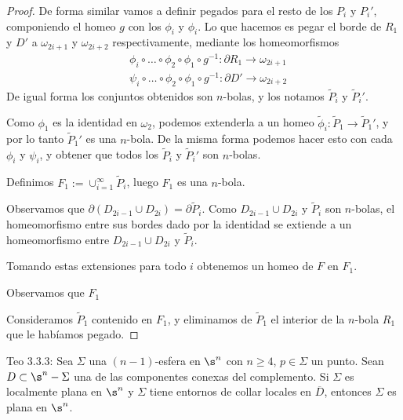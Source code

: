 \begin{proof}
De forma similar vamos a definir pegados para el resto de los $P_i$ y $P_i'$, componiendo el homeo $g$ con los $\phi_i$ y $\phi_i$. Lo que hacemos es pegar el borde de $R_1$ y $D'$ a $\omega_{2i+1}$ y $\omega_{2i+2}$ respectivamente, mediante los homeomorfismos\begin{align*}
	& \phi_i\circ\dots\circ\phi_2\circ\phi_1\circ g^{-1}\colon\partial R_1\to\omega_{2i+1}\\
	& \psi_i\circ\dots\circ\phi_2\circ\phi_1\circ g^{-1}\colon\partial D'\to\omega_{2i+2}
\end{align*}
De igual forma los conjuntos obtenidos son $n$-bolas, y los notamos $\tilde{P}_i$ y $\tilde{P}_i'$.

Como $\phi_1$ es la identidad en $\omega_2$, podemos extenderla a un homeo $\tilde{\phi}_i\colon\tilde{P}_1\to\tilde{P}_1'$, y por lo tanto $\tilde{P}_1'$ es una $n$-bola. De la misma forma podemos hacer esto con cada $\phi_i$ y $\psi_i$, y obtener que todos los $\tilde{P}_i$ y $\tilde{P}_i'$ son $n$-bolas.

Definimos $F_1:=\cup_{i=1}^\infty\tilde{P}_i$, luego $F_1$ es una $n$-bola.

Observamos que $\partial(D_{2i-1}\cup D_{2i}) = \partial\tilde{P}_i$. Como $D_{2i-1}\cup D_{2i}$ y $\tilde{P}_i$ son $n$-bolas, el homeomorfismo entre sus bordes dado por la identidad se extiende a un homeomorfismo entre $D_{2i-1}\cup D_{2i}$ y $\tilde{P}_i$.

Tomando estas extensiones para todo $i$ obtenemos un homeo de $F$ en $F_1$. 

Observamos que $F_1$

Consideramos $\tilde{P}_1$ contenido en $F_1$, y eliminamos de $\tilde{P}_1$ el interior de la $n$-bola $R_1$ que le habíamos pegado. 

\end{proof}


\begin{teo}
Teo 3.3.3: Sea $\Sigma$ una $(n-1)$-esfera en $\s^n$ con $n\geq 4$, $p\in\Sigma$ un punto. Sean $D\subset \s^n - \Sigma$ una de las componentes conexas del complemento. Si $\Sigma$ es localmente plana en $\s^n$ y $\Sigma$ tiene entornos de collar locales en $\overline{D}$, entonces $\Sigma$ es plana en $\s^n$.
\end{teo}

